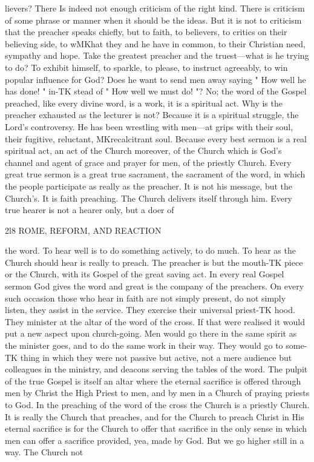 \documentclass[12pt,a5paper,oneside]{book}
\begin{document}
{{lievers? There Is indeed not enough criticism of the 
right kind. There is criticism of some phrase or 
manner when it should be the ideas. But it is not 
to criticism that the preacher speaks chiefly, but to 
faith, to believers, to critics on their believing side, to 
wMKhat they and he have in common, to their Christian 
need, sympathy and hope. Take the greatest preacher 
and the truest---what is he trying to do? To exhibit 
himself, to sparkle, to please, to instruct agreeably, to 
win popular influence for God? Does he want to 
send men away saying " How well he has done! " in-TK
stead of " How well we must do! "? No; the word 
of the Gospel preached, like every divine word, is a 
work, it is a spiritual act. Why is the preacher 
exhausted as the lecturer is not? Because it is a 
spiritual struggle, the Lord's controversy. He has 
been wrestling with men---at grips with their soul, 
their fugitive, reluctant, MKrecalcitrant soul. Because 
every best sermon is a real spiritual act, an act of the 
Church moreover, of the Church which is God's 
channel and agent of grace and prayer for men, of the 
priestly Church. Every great true sermon is a great 
true sacrament, the sacrament of the word, in which 
the people participate as really as the preacher. It 
is not his message, but the Church's. It is faith 
preaching. The Church delivers itself through him. 
Every true hearer is not a hearer only, but a doer of 



2l8 ROME, REFORM, AND REACTION 

the word. To hear well is to do something actively, 
to do much. To hear as the Church should hear is 
really to preach. The preacher is but the mouth-TK
piece or the Church, with its Gospel of the great 
saving act. In every real Gospel sermon God gives 
the word and great is the company of the preachers. 
On every such occasion those who hear in faith are 
not simply present, do not simply listen, they assist 
in the service. They exercise their universal priest-TK
hood. They minister at the altar of the word of the 
cross. If that were realised it would put a new 
aspect upon church-going. Men would go there in 
the same spirit as the minister goes, and to do the 
same work in their way. They would go to some-TK
thing in which they were not passive but active, not 
a mere audience but colleagues in the ministry, and 
deacons serving the tables of the word. The pulpit 
of the true Gospel is itself an altar where the eternal 
sacrifice is offered through men by Christ the High 
Priest to men, and by men in a Church of praying 
priests to God. In the preaching of the word of the 
cross the Church is a priestly Church. It is really the 
Church that preaches, and for the Church to preach 
Christ in His eternal sacrifice is for the Church to 
offer that sacrifice in the only sense in which men 
can offer a sacrifice provided, yea, made by God. 
But we go higher still in a way. The Church not 



}}
\end{document}
